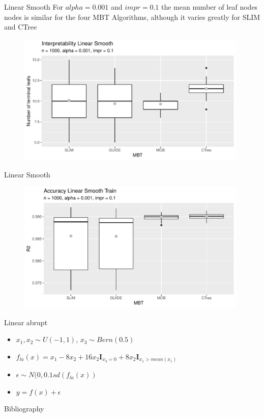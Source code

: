 \documentclass[9pt, xcolor=table]{beamer}
\begin{document}
\begin{frame}{Linear Smooth}
For  $alpha= 0.001$ and $impr = 0.1$ the mean number of leaf nodes nodes is similar for the four MBT Algorithms, although it varies greatly for SLIM and CTree
\begin{figure}
    \includegraphics[width=11cm]{Figures/simulations/batchtools/basic_scenarios/linear_smooth/ls_1000_standalone_int.pdf}
\end{figure}   

    
\end{frame}

\begin{frame}{Linear Smooth}
\begin{figure}
    \includegraphics[width=11cm]{Figures/simulations/batchtools/basic_scenarios/linear_smooth/ls_1000_standalone_r2_train.pdf}
\end{figure}  
    
\end{frame}


\begin{frame}{Linear abrupt}
\begin{itemize}
    \item $x_1, x_2 \sim U(-1,1)$, $x_3 \sim Bern(0.5)$
    \item $ f_{la}(x) = x_{1} - 8  x_2 + 16  x_2  \mathbf{I}_{x_3 = 0} + 8  x_2  \mathbf{I}_{x_1 > mean(x_1)}$
    \item $\epsilon \sim N(0, 0.1 sd(f_{la}(x))$
    \item $y = f(x) + \epsilon$
\end{itemize}    
\end{frame}


\begin{frame}{Bibliography}
    
    

\end{frame}
\end{document}
